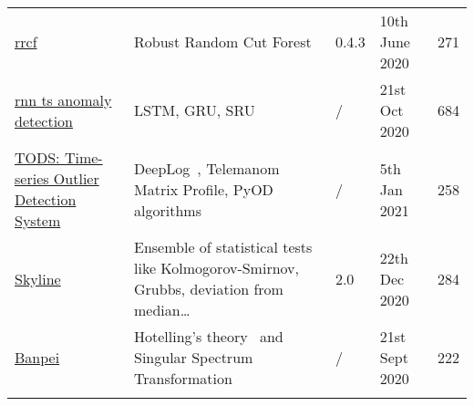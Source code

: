 \begin{table}[h]
{\begin{tabular}{lllll}
            \href{https://github.com/kLabUM/rrcf}{rrcf}                                                             & Robust Random Cut Forest~\cite{Guha.2016}                                                                                                                                                                                                                                                                                                                                                                                     & 0.4.3     & 10th June 2020    & 271   \\\addlinespace 
            \href{https://github.com/chickenbestlover/RNN-Time-series-Anomaly-Detection}{rnn ts anomaly detection}  & LSTM, GRU, SRU                                                                                                                                                                                                                                                                                                                                                                                                                & /         & 21st Oct 2020     & 684   \\\addlinespace 
            \href{https://github.com/datamllab/tods}{TODS: Time-series Outlier Detection System}                    & DeepLog~\cite{Du.2017}, Telemanom Matrix Profile, PyOD algorithms                                                                                                                                                                                                                                                                                                                                                             & /         & 5th Jan 2021      & 258   \\\addlinespace
            \href{https://github.com/earthgecko/skyline}{Skyline}                                                   & Ensemble of statistical tests like Kolmogorov-Smirnov, Grubbs, deviation from median\ldots                                                                                                                                                                                                                                                                                                                                    & 2.0       & 22th Dec 2020     & 284   \\\addlinespace
            \href{https://github.com/tsurubee/banpei}{Banpei}                                                       & Hotelling's theory~\cite{Hotelling.1990} and Singular Spectrum Transformation                                                                                                                                                                                                                                                                                                                                                 & /         & 21st Sept 2020    & 222   \\\addlinespace

\end{tabular}}
\end{table}
